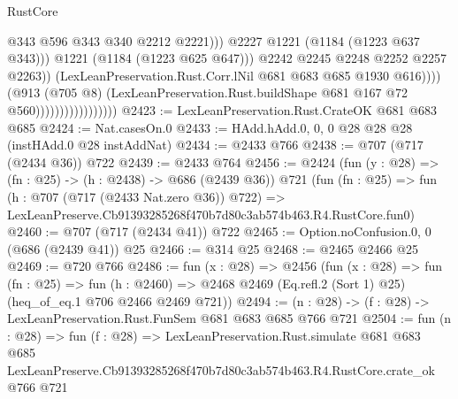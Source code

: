 \begin{lexlean}{RustCore}
\begin{coremodule}
                                                      @343
                                                      @596
                                                      @343
                                                      @340
                                                      @2212
                                                      @2221)))
                                                @2227
                                                @1221
                                                (@1184 (@1223 @637 @343)))
                                              @1221
                                              (@1184 (@1223 @625 @647)))
                                            @2242
                                            @2245
                                            @2248
                                            @2252
                                            @2257
                                            @2263))
                                        (LexLeanPreservation.Rust.Corr.lNil
                                          @681
                                          @683
                                          @685
                                          @1930
                                          @616))))
                                  (@913
                                    (@705 @8)
                                    (LexLeanPreservation.Rust.buildShape
                                      @681
                                      @167
                                      @72
                                      @560)))))))))))))))))
@2423 := LexLeanPreservation.Rust.CrateOK @681 @683 @685
@2424 := Nat.casesOn.{0}
@2433 := HAdd.hAdd.{0, 0, 0} @28 @28 @28 (instHAdd.{0} @28 instAddNat)
@2434 := @2433 @766
@2438 := @707 (@717 (@2434 @36)) @722
@2439 := @2433 @764
@2456 := @2424
    (fun (y : @28) => (fn : @25) -> (h : @2438) -> @686 (@2439 @36))
    @721
    (fun (fn : @25) =>
    fun (h : @707 (@717 (@2433 Nat.zero @36)) @722) =>
    LexLeanPreserve.Cb91393285268f470b7d80c3ab574b463.R4.RustCore.fun0)
@2460 := @707 (@717 (@2434 @41)) @722
@2465 := Option.noConfusion.{0, 0} (@686 (@2439 @41)) @25
@2466 := @314 @25
@2468 := @2465 @2466 @25
@2469 := @720 @766
@2486 := fun (x : @28) =>
  @2456
    (fun (x : @28) =>
    fun (fn : @25) =>
    fun (h : @2460) => @2468 @2469 (Eq.refl.{2} (Sort 1) @25) (heq_of_eq.{1} @706 @2466 @2469 @721))
@2494 := (n : @28) -> (f : @28) -> LexLeanPreservation.Rust.FunSem @681 @683 @685 @766 @721
@2504 := fun (n : @28) =>
  fun (f : @28) =>
  LexLeanPreservation.Rust.simulate
    @681
    @683
    @685
    LexLeanPreserve.Cb91393285268f470b7d80c3ab574b463.R4.RustCore.crate_ok
    @766
    @721
\end{coremodule}
\end{lexlean}
